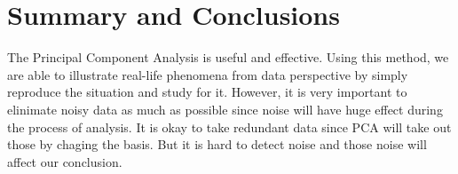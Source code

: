 \documentclass[twoside,twocolumn]{article}
\begin{document}
    \section{Summary and Conclusions}
    The Principal Component Analysis is useful and effective. Using this method, we are able to illustrate real-life
    phenomena from data perspective by simply reproduce the situation and study for it. However, it is very important to 
    elinimate noisy data as much as possible since noise will have huge effect during the process of analysis. It is okay
    to take redundant data since PCA will take out those by chaging the basis. But it is hard to detect noise and those noise
    will affect our conclusion.

    \mbox{~}
    \clearpage
    \begin{appendices}
        
    \end{appendices}
\end{document}
